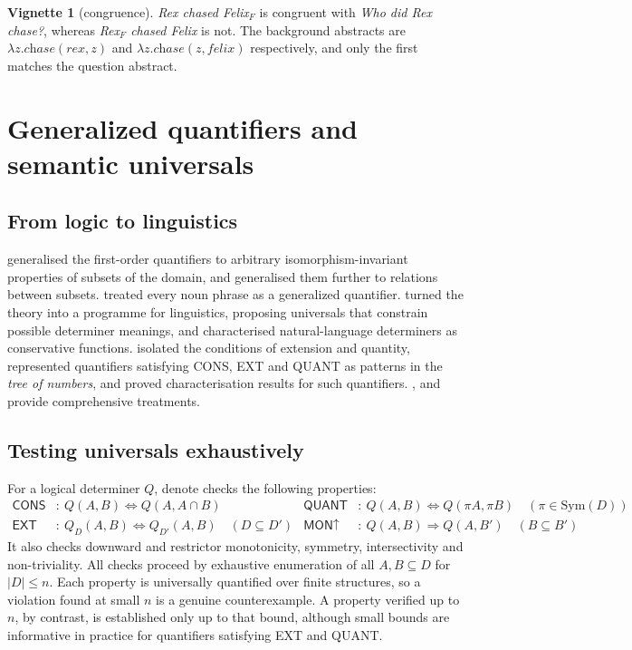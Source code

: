 \documentclass[11pt,a4paper]{article}
\newcommand{\dn}{\textsf{denote}}
\theoremstyle{definition}
\newtheorem{vignette}{Vignette}
\begin{document}
\begin{vignette}[congruence]\label{v:congruence}
\textit{Rex chased Felix$_F$} is congruent with \textit{Who did Rex chase?}, whereas \textit{Rex$_F$ chased Felix} is not. The background abstracts are $\lambda z.\textit{chase}(\textit{rex},z)$ and $\lambda z.\textit{chase}(z,\textit{felix})$ respectively, and only the first matches the question abstract.
\end{vignette}

\section{Generalized quantifiers and semantic universals}\label{sec:gq}

\subsection{From logic to linguistics}
\citet{mostowski1957} generalised the first-order quantifiers to arbitrary isomorphism-invariant properties of subsets of the domain, and \citet{lindstrom1966} generalised them further to relations between subsets. \citet{montague1973} treated every noun phrase as a generalized quantifier. \citet{barwisecooper1981} turned the theory into a programme for linguistics, proposing universals that constrain possible determiner meanings, and \citet{keenanstavi1986} characterised natural-language determiners as conservative functions. \citet{vanbenthem1984,vanbenthem1986} isolated the conditions of extension and quantity, represented quantifiers satisfying CONS, EXT and QUANT as patterns in the \emph{tree of numbers}, and proved characterisation results for such quantifiers. \citet{westerstahl1989}, \citet{keenan2002} and \citet{peterswesterstahl2006} provide comprehensive treatments.

\subsection{Testing universals exhaustively}
For a logical determiner $Q$, \dn{} checks the following properties:
\begin{align*}
\textsf{CONS}&:\ Q(A,B)\Leftrightarrow Q(A,A\cap B) &
\textsf{QUANT}&:\ Q(A,B)\Leftrightarrow Q(\pi A,\pi B)\quad (\pi\in\mathrm{Sym}(D))\\
\textsf{EXT}&:\ Q_D(A,B)\Leftrightarrow Q_{D'}(A,B)\quad (D\subseteq D') &
\textsf{MON}{\uparrow}&:\ Q(A,B)\Rightarrow Q(A,B')\quad (B\subseteq B')
\end{align*}
It also checks downward and restrictor monotonicity, symmetry, intersectivity and non-triviality. All checks proceed by exhaustive enumeration of all $A,B\subseteq D$ for $|D|\le n$. Each property is universally quantified over finite structures, so a violation found at small $n$ is a genuine counterexample. A property verified up to $n$, by contrast, is established only up to that bound, although small bounds are informative in practice for quantifiers satisfying EXT and QUANT.
\end{document}
